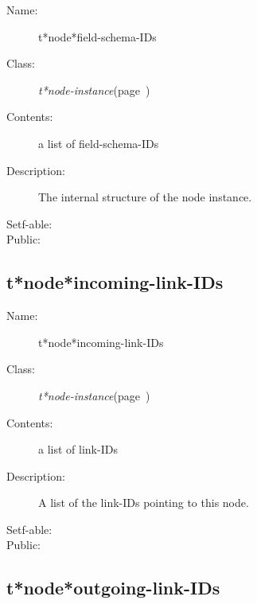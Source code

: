 \begin{description}
\item [Name:]  t*node*field-schema-IDs

\item [Class:] {\sl t*node-instance}\hfill(page~\pageref{t*node-instance})

\item [Contents:] a list of field-schema-IDs

\item [Description:]

The internal structure of the node instance. 

\item [Setf-able:]


\item [Public:]



\end{description}
\horizontalline

\subsection{t*node*incoming-link-IDs}
\label{t*node*incoming-link-IDs}

\begin{description}
\item [Name:]  t*node*incoming-link-IDs

\item [Class:] {\sl t*node-instance}\hfill(page~\pageref{t*node-instance})

\item [Contents:] a list of link-IDs

\item [Description:]

A list of the link-IDs pointing to this node.

\item [Setf-able:]


\item [Public:]



\end{description}
\horizontalline

\subsection{t*node*outgoing-link-IDs}
\label{t*node*outgoing-link-IDs}

